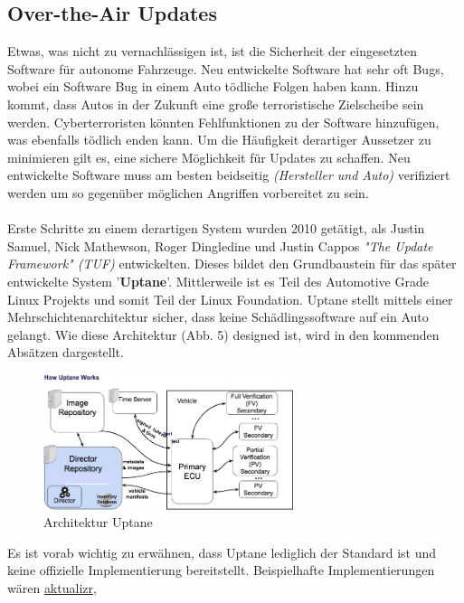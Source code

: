 \subsection{Over-the-Air Updates\cite{b33}}
Etwas, was nicht zu vernachlässigen ist, ist die Sicherheit der eingesetzten Software für autonome Fahrzeuge. Neu entwickelte Software hat sehr oft Bugs, wobei ein Software Bug in einem Auto tödliche Folgen haben kann. Hinzu kommt, dass Autos in der Zukunft eine große terroristische Zielscheibe sein werden. Cyberterroristen könnten Fehlfunktionen zu der Software hinzufügen, was ebenfalls tödlich enden kann. Um die Häufigkeit derartiger Aussetzer zu minimieren gilt es, eine sichere Möglichkeit für Updates zu schaffen. Neu entwickelte Software muss am besten beidseitig \textit{(Hersteller und Auto)} verifiziert werden um so gegenüber möglichen Angriffen vorbereitet zu sein.\\\\
Erste Schritte zu einem derartigen System wurden 2010 getätigt, als Justin Samuel, Nick Mathewson, Roger Dingledine und Justin Cappos \textit{"The Update Framework" (TUF)} entwickelten. Dieses bildet den Grundbaustein für das später entwickelte System '\textbf{Uptane}'. Mittlerweile ist es Teil des Automotive Grade Linux Projekts und somit Teil der Linux Foundation. Uptane stellt mittels einer Mehrschichtenarchitektur sicher, dass keine Schädlingssoftware auf ein Auto gelangt. Wie diese Architektur (Abb. 5) designed ist, wird in den kommenden Absätzen dargestellt.\\
\begin{figure}
  \begin{center}
    \includegraphics[width=0.65\textwidth]{pictures/uptane_architecture.png}
  \end{center}
  \caption{Architektur Uptane}
\end{figure}
Es ist vorab wichtig zu erwähnen, dass Uptane lediglich der Standard ist und keine offizielle Implementierung bereitstellt. Beispielhafte Implementierungen wären \hyperlink{https://github.com/advancedtelematic/aktualizr}{aktualizr},
